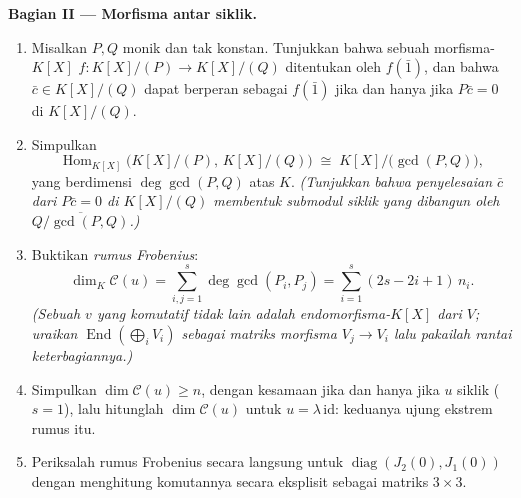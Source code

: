 \begin{problem}
\medskip
\noindent\textbf{Bagian II --- Morfisma antar  siklik.}
\begin{enumerate}[resume]
  \item Misalkan $P, Q$ monik dan tak konstan. Tunjukkan bahwa sebuah
        morfisma-$K[X]$ $f \colon K[X]/(P) \to K[X]/(Q)$
        ditentukan oleh $f(\bar 1)$, dan bahwa $\bar c \in K[X]/(Q)$
        dapat berperan sebagai $f(\bar 1)$ jika dan hanya jika $P\bar c = 0$ di $K[X]/(Q)$.
  \item Simpulkan
        \[
        \operatorname{Hom}_{K[X]}\bigl(K[X]/(P),\, K[X]/(Q)\bigr)
        \;\cong\; K[X]\big/\bigl(\gcd(P, Q)\bigr),
        \]
        yang berdimensi $\deg \gcd(P, Q)$ atas $K$. \emph{(Tunjukkan bahwa
        penyelesaian $\bar c$ dari $P\bar c = 0$ di $K[X]/(Q)$
        membentuk submodul siklik yang dibangun oleh
        $\overline{Q/\gcd(P,Q)}$.)}
  \item Buktikan \emph{rumus Frobenius}:
        \[
        \dim_K \mathcal C(u) = \sum_{i,j=1}^{s} \deg\gcd(P_i,
        P_j) = \sum_{i=1}^{s} (2s - 2i + 1)\, n_i .
        \]
        \emph{(Sebuah $v$ yang komutatif tidak lain adalah endomorfisma-$K[X]$ dari
        $V$; uraikan $\operatorname{End}(\bigoplus_i V_i)$ sebagai
        matriks morfisma $V_j \to V_i$ lalu pakailah
        rantai keterbagiannya.)}
  \item Simpulkan $\dim \mathcal C(u) \geq n$, dengan kesamaan jika dan hanya jika $u$
        siklik ($s = 1$), lalu hitunglah $\dim\mathcal C(u)$ untuk
        $u = \lambda\,\mathrm{id}$: keduanya ujung ekstrem rumus itu.
  \item Periksalah rumus Frobenius secara langsung untuk
        $\operatorname{diag}(J_2(0), J_1(0))$ dengan menghitung
        komutannya secara eksplisit sebagai matriks $3\times3$.
\end{enumerate}


\end{problem}
